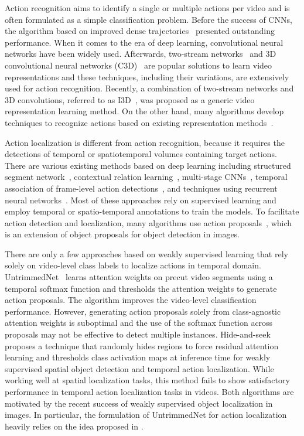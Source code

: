 \documentclass[10pt,twocolumn,letterpaper]{article}
\begin{document}
Action recognition aims to identify a single or multiple actions per video and is often formulated as a simple classification problem.
Before the success of CNNs, the algorithm based on improved dense trajectories~\cite{wang13action} presented outstanding performance.
When it comes to the era of deep learning, convolutional neural networks have been widely used.
Afterwards, two-stream networks~\cite{simonyan14two} and 3D convolutional neural networks (C3D)~\cite{tran15learning} are popular solutions to learn video representations and these techniques, including their variations, are extensively used for action recognition.
Recently, a combination of two-stream networks and 3D convolutions, referred to as I3D~\cite{carreira17quo}, was proposed as a generic video representation learning method.
On the other hand, many algorithms develop techniques to recognize actions based on existing representation methods~\cite{wang16temporal,wang17spatiotemporal,feichtenhofer16spatiotemporal,girdhar17actionvlad,feichtenhofer17spatiotemporal,shi17learning}.


Action localization is different from action recognition, because it requires the detections of temporal or spatiotemporal volumes containing target actions.
There are various existing methods based on deep learning including structured segment network~\cite{zhao17temporal}, contextual relation learning~\cite{soomro15action}, multi-stage CNNs~\cite{shou16temporal}, temporal association of frame-level action detections~\cite{gkioxari15finding}, and techniques using recurrent neural networks~\cite{yeung16end,ma16learning}.
Most of these approaches rely on supervised learning and employ temporal or spatio-temporal annotations to train the models.
To facilitate action detection and localization, many algorithms use action proposals~\cite{buch17sst,escorcia16daps,wang16actioness}, which is an extension of object proposals for object detection in images.

There are only a few approaches based on weakly supervised learning that rely solely on video-level class labels to localize actions in temporal domain.
UntrimmedNet~\cite{wang17untrimmednets} learns attention weights on precut video segments using a temporal softmax function and thresholds the attention weights to generate action proposals. The algorithm improves the video-level classification performance.
However, generating action proposals solely from class-agnostic attention weights is suboptimal and the use of the softmax function across proposals may not be effective to detect multiple instances.
Hide-and-seek~\cite{singh17hide} proposes a technique that randomly hides regions to force residual attention learning and thresholds class activation maps at inference time for weakly supervised spatial object detection and temporal action localization.
While working well at spatial localization tasks, this method fails to show satisfactory performance in temporal action localization tasks in videos.
Both algorithms are motivated by the recent success of weakly supervised object localization in images.
In particular, the formulation of UntrimmedNet for action localization heavily relies on the idea proposed in \cite{bilen16weakly}.
\end{document}

